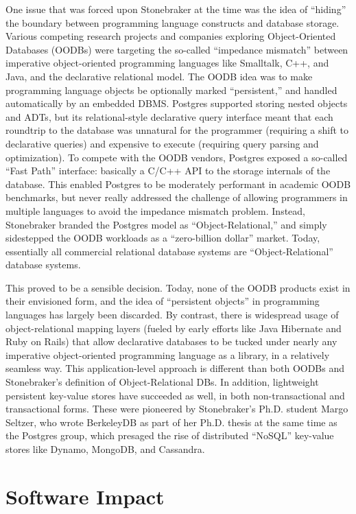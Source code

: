 \documentclass[sigconf,natbib=false]{acmart}
\begin{document}
One issue that was forced upon Stonebraker at the time was the idea of ``hiding'' the boundary between programming language constructs and database storage. Various competing research projects and companies exploring Object-Oriented Databases (OODBs) were targeting the so-called ``impedance mismatch'' between imperative object-oriented programming languages like Smalltalk, C++, and Java, and the declarative relational model. The OODB idea was to make programming language objects be optionally marked ``persistent,'' and handled automatically by an embedded DBMS. Postgres supported storing nested objects and ADTs, but its relational-style declarative query interface meant that each roundtrip to the database was unnatural for the programmer (requiring a shift to declarative queries) and expensive to execute (requiring query parsing and optimization). To compete with the OODB vendors, Postgres exposed a so-called ``Fast Path'' interface: basically a C/C++ API to the storage internals of the database. This enabled Postgres to be moderately performant in academic OODB benchmarks, but never really addressed the challenge of allowing programmers in multiple languages to avoid the impedance mismatch problem. Instead, Stonebraker branded the Postgres model as ``Object-Relational,'' and simply sidestepped the OODB workloads as a ``zero-billion dollar'' market.  Today, essentially all commercial relational database systems are ``Object-Relational'' database systems.

This proved to be a sensible decision. Today, none of the OODB products exist in their envisioned form, and the idea of ``persistent objects'' in programming languages has largely been discarded. By contrast, there is widespread usage of object-relational mapping layers (fueled by early efforts like Java Hibernate and Ruby on Rails) that allow declarative databases to be tucked under nearly any imperative object-oriented programming language as a library, in a relatively seamless way. This application-level approach is different than both OODBs and Stonebraker's definition of Object-Relational DBs.  In addition, lightweight persistent key-value stores have succeeded as well, in both non-transactional and transactional forms. These were pioneered by Stonebraker's Ph.D. student Margo Seltzer, who wrote BerkeleyDB as part of her Ph.D. thesis at the same time as the Postgres group, which presaged the rise of distributed ``NoSQL'' key-value stores like Dynamo, MongoDB, and Cassandra.

\section{Software Impact}
\end{document}
